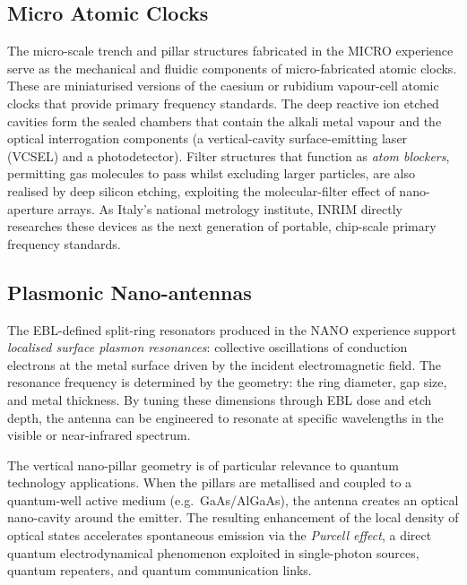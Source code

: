 
\subsection{Micro Atomic Clocks}

The micro-scale trench and pillar structures fabricated in the MICRO experience serve as the mechanical and fluidic components of micro-fabricated atomic clocks. These are miniaturised versions of the caesium or rubidium vapour-cell atomic clocks that provide primary frequency standards. The deep reactive ion etched cavities form the sealed chambers that contain the alkali metal vapour and the optical interrogation components (a vertical-cavity surface-emitting laser (VCSEL) and a photodetector). Filter structures that function as \textit{atom blockers}, permitting gas molecules to pass whilst excluding larger particles, are also realised by deep silicon etching, exploiting the molecular-filter effect of nano-aperture arrays. As Italy's national metrology institute, INRIM directly researches these devices as the next generation of portable, chip-scale primary frequency standards.

\subsection{Plasmonic Nano-antennas}

The EBL-defined split-ring resonators produced in the NANO experience support \textit{localised surface plasmon resonances}: collective oscillations of conduction electrons at the metal surface driven by the incident electromagnetic field. The resonance frequency is determined by the geometry: the ring diameter, gap size, and metal thickness. By tuning these dimensions through EBL dose and etch depth, the antenna can be engineered to resonate at specific wavelengths in the visible or near-infrared spectrum.

The vertical nano-pillar geometry is of particular relevance to quantum technology applications. When the pillars are metallised and coupled to a quantum-well active medium (e.g.\ GaAs/AlGaAs), the antenna creates an optical nano-cavity around the emitter. The resulting enhancement of the local density of optical states accelerates spontaneous emission via the \textit{Purcell effect}, a direct quantum electrodynamical phenomenon exploited in single-photon sources, quantum repeaters, and quantum communication links.

